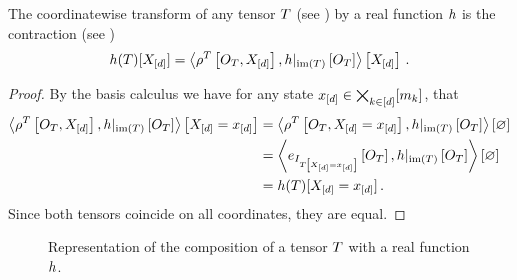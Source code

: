 \begin{theorem}\label{the:tensorFunctionComposition}
	The coordinatewise transform of any tensor $T$ (see ) by a real function $h$ is the contraction (see )
	\begin{align*}
		h(T)[X_{[d]}]
		= \left\langle \rho^{T}\left[O_{T},X_{[d]}\right],{h}|_{\mathrm{im}\left(T\right)}\left[O_{T}\right] \right\rangle \left[ X_{[d]} \right] \, .
	\end{align*}
\end{theorem}
\begin{proof}
	By the basis calculus  we have for any state $x_{[d]}\in\bigtimes_{k\in[d]}[m_{k}]$, that
	\begin{align*}
		\left\langle \rho^{T}\left[O_{T},X_{[d]}\right],{h}|_{\mathrm{im}\left(T\right)}\left[O_{T}\right]\right\rangle \left[ X_{[d]}=x_{[d]} \right]
		&= \left\langle \rho^{T}\left[O_{T},X_{[d]}=x_{[d]}\right],{h}|_{\mathrm{im}\left(T\right)}\left[O_{T}\right]\right\rangle \left[ \varnothing \right] \\
		& = \left\langle e_{I_{T\left[X_{[d]}=x_{[d]}\right]}}\left[O_{T}\right],{h}|_{\mathrm{im}\left(T\right)}\left[O_{T}\right]\right\rangle \left[ \varnothing \right] \\
		& = h(T)[X_{[d]}=x_{[d]}] \, .
	\end{align*}
	Since both tensors coincide on all coordinates, they are equal.
\end{proof}

\begin{figure}[h]
\begin{center}
	
\end{center}
\caption{Representation of the composition of a tensor $T$ with a real function $h$.}
\label{fig:tensorFunctionComposition}
\end{figure}


